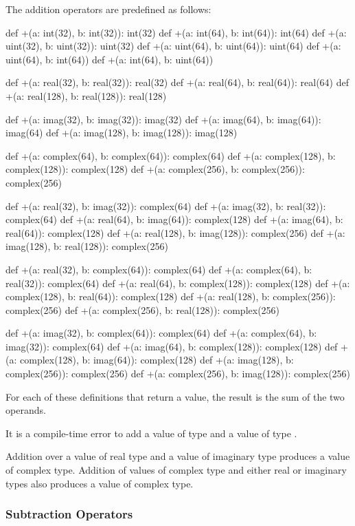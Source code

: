 The addition operators are predefined as follows:
\begin{chapel}
def +(a: int(32), b: int(32)): int(32)
def +(a: int(64), b: int(64)): int(64)
def +(a: uint(32), b: uint(32)): uint(32)
def +(a: uint(64), b: uint(64)): uint(64)
def +(a: uint(64), b: int(64))
def +(a: int(64), b: uint(64))

def +(a: real(32), b: real(32)): real(32)
def +(a: real(64), b: real(64)): real(64)
def +(a: real(128), b: real(128)): real(128)

def +(a: imag(32), b: imag(32)): imag(32)
def +(a: imag(64), b: imag(64)): imag(64)
def +(a: imag(128), b: imag(128)): imag(128)

def +(a: complex(64), b: complex(64)): complex(64)
def +(a: complex(128), b: complex(128)): complex(128)
def +(a: complex(256), b: complex(256)): complex(256)

def +(a: real(32), b: imag(32)): complex(64)
def +(a: imag(32), b: real(32)): complex(64)
def +(a: real(64), b: imag(64)): complex(128)
def +(a: imag(64), b: real(64)): complex(128)
def +(a: real(128), b: imag(128)): complex(256)
def +(a: imag(128), b: real(128)): complex(256)

def +(a: real(32), b: complex(64)): complex(64)
def +(a: complex(64), b: real(32)): complex(64)
def +(a: real(64), b: complex(128)): complex(128)
def +(a: complex(128), b: real(64)): complex(128)
def +(a: real(128), b: complex(256)): complex(256)
def +(a: complex(256), b: real(128)): complex(256)

def +(a: imag(32), b: complex(64)): complex(64)
def +(a: complex(64), b: imag(32)): complex(64)
def +(a: imag(64), b: complex(128)): complex(128)
def +(a: complex(128), b: imag(64)): complex(128)
def +(a: imag(128), b: complex(256)): complex(256)
def +(a: complex(256), b: imag(128)): complex(256)
\end{chapel}
For each of these definitions that return a value, the result is the
sum of the two operands.

It is a compile-time error to add a value of type  and
a value of type .

Addition over a value of real type and a value of imaginary type
produces a value of complex type.  Addition of values of complex type
and either real or imaginary types also produces a value of complex
type.

\subsubsection{Subtraction Operators}
\label{Subtraction_Operators}

